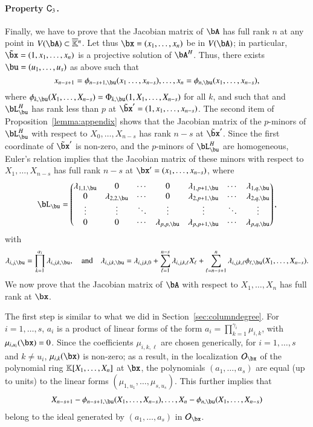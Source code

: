 \documentclass[amsthm]{elsart}
\begin{document}
\paragraph*{Property $\mathsf{C}_3$.} Finally, we have to prove that the Jacobian
matrix of $\bA$ has full rank $n$ at any point in $V(\bA) \subset
\KKbar{}^n$. Let thus $\bx=(x_1,\dots,x_n)$ be in $V(\bA)$; in
particular, $\tilde \bx=(1,x_1,\dots,x_n)$ is a projective solution of
$\bA^H$.  Thus, there exists $\bu=(u_1,\dots,u_s)$ as above such that
$$x_{n-s+1}=\phi_{n-s+1,\bu}(x_1\dots,x_{n-s}),\dots,x_{n}=\phi_{n,\bu}(x_1,\dots,x_{n-s}),$$
where $\phi_{k,\bu}(X_1,\dots,X_{n-s})=\Phi_{k,\bu}(1,X_1,\dots,X_{n-s})$ for 
all $k$, and such that
and $\bL^H_\bu$ has rank less than $p$ at $\tilde\bx'=(1,x_1,\dots,x_{n-s})$.  The second item of
Proposition~\ref{lemma:appendix} shows that the Jacobian matrix of
the $p$-minors of 
$\bL^H_\bu$ with respect to $X_0,\dots,X_{n-s}$ has rank $n-s$
at $\tilde \bx'$. Since the first coordinate of $\tilde\bx'$ is non-zero,
and the $p$-minors  of $\bL^H_\bu$ are homogeneous,
Euler's relation implies that the Jacobian matrix of 
these minors
with respect to $X_1,\dots,X_{n-s}$
has full rank $n-s$ at $\bx'=(x_1,\dots,x_{n-s})$, where  
\begin{align}\label{eqdef:Lu}
 \bL_\bu = \left( \begin{matrix}
\lambda_{1,1,\bu} & 0 & \cdots & 0 & \lambda_{1,p+1,\bu} & \cdots & \lambda_{1, q,\bu}\\
0 & \lambda_{2,2,\bu} & \cdots & 0 & \lambda_{2,p+1,\bu} & \cdots & \lambda_{2, q,\bu}\\
\vdots & \vdots & \ddots & \vdots & \vdots & \ddots & \vdots\\
0 & 0 & \cdots & \lambda_{p,p,\bu} & \lambda_{p,p+1,\bu} & \cdots & \lambda_{p, q,\bu}
\end{matrix} \right),
\end{align}
with
$$\lambda_{i,j,\bu}=\prod_{k=1}^{\alpha_i}\lambda_{i,j,k,\bu},
\quad\text{and}\quad \lambda_{i,j,k,\bu}=\lambda_{i,j,k,0}+\sum_{\ell
  = 1}^{n-s}\lambda_{i,j,k,\ell}X_\ell + \sum_{\ell =
  n-s+1}^{n}\lambda_{i,j,k,\ell}
\phi_{\ell,\bu}(X_1,\dots,X_{n-s}).$$ We now prove
that the Jacobian matrix of $\bA$ with respect to $X_1,\dots,X_n$ has
full rank at $\bx$.

The first step is similar to what we did in Section~\ref{sec:columndegree}.  For
$i=1,\dots,s$, $a_i$ is a product of linear forms of the form
$a_i=\prod_{k=1}^{\gamma_i} \mu_{i,k}$, with $\mu_{i,u_i}(\bx)=0$.
Since the coefficients $\mu_{i,k,\ell}$ are chosen generically, for
$i=1,\dots,s$ and $k \ne u_i$, $\mu_{i,k}(\bx)$ is non-zero; as a
result, in the localization  $\mathcal{O}_\bx$ of the polynomial ring $\mathbb{K}[X_1,\dots,X_{n}]$ at $\bx$,
 the polynomials $(a_1,\dots,a_s)$
are equal (up to units) to the linear forms
$(\mu_{1,u_1},\dots,\mu_{s,u_s})$. This further implies that
\begin{align}\label{eq:subst}
X_{n-s+1}-\phi_{n-s+1,\bu}(X_1,\dots,X_{n-s}),\dots,X_{n}-\phi_{n,\bu}(X_1,\dots,X_{n-s})
\end{align}
belong to the ideal generated by $(a_1,\dots,a_s)$ in
$\mathcal{O}_\bx$.
\end{document}
